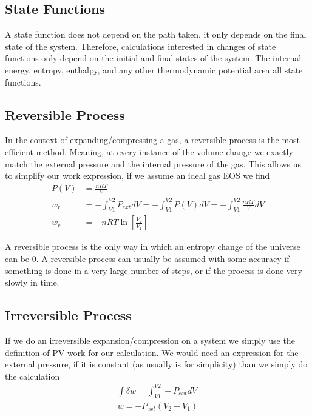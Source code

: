 \documentclass{article}
\begin{document}
 \subsection{State Functions}
 A state function does not depend on the path taken, it only depends on the final state of the system.
 Therefore, calculations interested in changes of state functions only depend on the initial and final states of the system. 
 The internal energy, entropy, enthalpy, and any other thermodynamic potential area all state functions. 
 
 \subsection{Reversible Process}
 In the context of expanding/compressing a gas, a reversible process is the most efficient method. 
 Meaning, at every instance of the volume change we exactly match the external pressure and the internal pressure of the gas. 
 This allows us to simplify our work expression, if we assume an ideal gas EOS we find
 \begin{equation}
\begin{split}
    P(V) &= \frac{nRT}{V} \\
    w_{r} &= -\int_{V1}^{V2} P_{ext}dV = -\int_{V1}^{V2} P(V)dV = -\int_{V1}^{V2} \frac{nRT}{V} dV \\
    w_{r} &= -nRT\ln \left[\frac{V_2}{V_1}\right]
\end{split}
\end{equation} 

A reversible process is the only way in which an entropy change of the universe can be 0.
A reversible process can usually be assumed with some accuracy if something is done in a very large number of steps, or if the process is done very slowly in time.
 
 \subsection{Irreversible Process}
 If we do an irreversible expansion/compression on a system we simply use the definition of PV work for our calculation. 
 We would need an expression for the external pressure, if it is constant (as usually is for simplicity) than we simply do the calculation
 \begin{equation}
\begin{split}
        \int \delta w = \int_{V1}^{V2} -P_{ext}dV \\
        w = -P_{ext}(V_2-V_1)
\end{split}
\end{equation}
\end{document}
